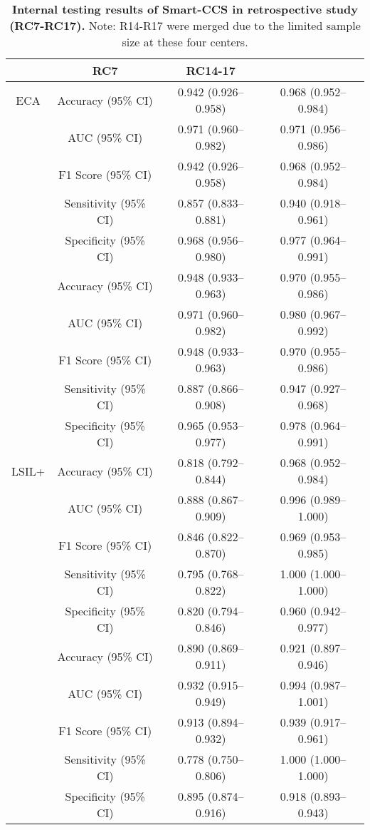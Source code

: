\clearpage
\begin{table}[h] 
\renewcommand{\arraystretch}{2}
\renewcommand{\tablename}{Extended Data Table.}
\centering 
\caption{\textbf{Internal testing results of Smart-CCS in retrospective study (RC7-RC17).} Note: R14-R17 were merged due to the limited sample size at these four centers.}
\begin{tabular}{cc|c|c} 
\hline
 \rowcolor{cusyellow} \multicolumn{2}{c|}{\multirow{1}{*}{\textbf{
 Metrics}}}  & \textbf{RC7 }& \textbf{RC14-17 }\\ 
\hline
\multirow{1}{*}{ECA}&Accuracy (95\% CI) & 0.942 (0.926–0.958) & 0.968 (0.952–0.984) \\
& AUC (95\% CI)  & 0.971 (0.960–0.982) & 0.971 (0.956–0.986) \\
& F1 Score (95\% CI) & 0.942 (0.926–0.958) & 0.968 (0.952–0.984) \\
& Sensitivity (95\% CI)  & 0.857 (0.833–0.881) & 0.940 (0.918–0.961) \\
& Specificity (95\% CI)  & 0.968 (0.956–0.980) & 0.977 (0.964–0.991) \\

 \rowcolor{cusyellowl}  \multirow{1}{*}{ASC-US+ }&Accuracy (95\% CI) & 0.948 (0.933–0.963) & 0.970 (0.955–0.986) \\
 \rowcolor{cusyellowl}  & AUC (95\% CI)  & 0.971 (0.960–0.982) & 0.980 (0.967–0.992) \\
 \rowcolor{cusyellowl}  & F1 Score (95\% CI)  & 0.948 (0.933–0.963) & 0.970 (0.955–0.986) \\
 \rowcolor{cusyellowl}  & Sensitivity (95\% CI)  & 0.887 (0.866–0.908) & 0.947 (0.927–0.968) \\
 \rowcolor{cusyellowl}  & Specificity (95\% CI)    & 0.965 (0.953–0.977) & 0.978 (0.964–0.991) \\

\multirow{1}{*}{LSIL+}&Accuracy (95\% CI)  & 0.818 (0.792–0.844) & 0.968 (0.952–0.984) \\
& AUC (95\% CI) & 0.888 (0.867–0.909) & 0.996 (0.989–1.000) \\
& F1 Score (95\% CI) & 0.846 (0.822–0.870) & 0.969 (0.953–0.985) \\
& Sensitivity (95\% CI) & 0.795 (0.768–0.822) & 1.000 (1.000–1.000) \\
& Specificity (95\% CI) & 0.820 (0.794–0.846) & 0.960 (0.942–0.977) \\

 \rowcolor{cusyellowl}   \multirow{1}{*}{HSIL+}&Accuracy (95\% CI) & 0.890 (0.869–0.911) & 0.921 (0.897–0.946) \\
 \rowcolor{cusyellowl}  & AUC (95\% CI)  & 0.932 (0.915–0.949) & 0.994 (0.987–1.001) \\
 \rowcolor{cusyellowl}  & F1 Score (95\% CI)  & 0.913 (0.894–0.932) & 0.939 (0.917–0.961) \\
 \rowcolor{cusyellowl}  & Sensitivity (95\% CI)  & 0.778 (0.750–0.806) & 1.000 (1.000–1.000) \\
 \rowcolor{cusyellowl}  & Specificity (95\% CI)  & 0.895 (0.874–0.916) & 0.918 (0.893–0.943) \\


\end{tabular}
\end{table}
